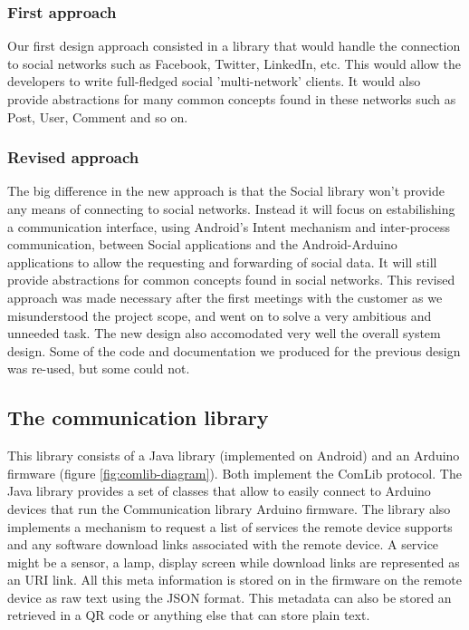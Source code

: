\subsubsection{First approach}
Our first design approach consisted in a library that would handle the connection to social networks
such as Facebook, Twitter, LinkedIn, etc. This would  allow the developers to write full-fledged
social 'multi-network' clients. It would also provide abstractions for many common concepts
found in these networks such as Post, User, Comment and so on.

\subsubsection{Revised approach}
The big difference in the new approach is that the Social library won't provide any means
of connecting to social networks. Instead it will focus on estabilishing a communication interface,
using Android's Intent mechanism and inter-process communication, between Social applications and
the Android-Arduino applications to allow the requesting and forwarding of social data.
It will still provide abstractions for common concepts found in social networks.
This revised approach was made necessary after the first meetings with the customer as we misunderstood
the project scope, and went on to solve a very ambitious and unneeded task. The new design also accomodated
very well the overall system design. Some of the code and documentation we produced for the previous design
was re-used, but some could not.



\subsection{The communication library}
This library consists of a Java library (implemented on Android) and an Arduino firmware (figure \ref{fig:comlib-diagram}). 
Both implement the ComLib protocol. The Java library provides a set of classes that allow to easily connect to Arduino 
devices that run the Communication library Arduino firmware. The library also implements a mechanism to request a list of 
services the remote device supports and any software download links associated with the remote device. A service might
be a sensor, a lamp, display screen while download links are represented as an URI link. All this meta information is stored
on in the firmware on the remote device as raw text using the JSON format. This metadata can also be stored an retrieved
in a QR code or anything else that can store plain text.

